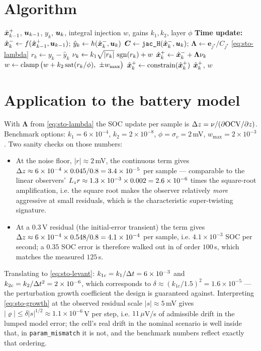 \section{Algorithm}
\begin{algorithm}[H]
\caption{SuperTwisting-SMO --- one sampling period}
\begin{algorithmic}[1]
\Require $\hat{\bm{x}}^{+}_{k-1}$, $\bm{u}_{k-1}$, $y_k$, $\bm{u}_k$, integral injection $w$, gains $k_1,k_2$, layer $\phi$
\State \textbf{Time update:} $\hat{\bm{x}}^{-}_k \gets f(\hat{\bm{x}}^{+}_{k-1},\bm{u}_{k-1})$; \quad $\hat{y}_k \gets h(\hat{\bm{x}}^{-}_k,\bm{u}_k)$
\State $\bm{C} \gets \texttt{jac\_H}(\hat{\bm{x}}^{-}_k,\bm{u}_k)$; \quad $\bm{\Lambda}\gets \bm{e}_{j^\star}/C_{j^\star}$ \eqref{eq:sto-lambda}
\State $r_k \gets y_k - \hat{y}_k$
\State $\nu_k \gets k_1\sqrt{|r_k|}\,\operatorname{sgn}(r_k) + w$ 
\State $\hat{\bm{x}}^{+}_k \gets \hat{\bm{x}}^{-}_k + \bm{\Lambda}\nu_k$
\State $w \gets \operatorname{clamp}\big(w + k_2\operatorname{sat}(r_k/\phi),\ \pm w_{\max}\big)$ 
\State $\hat{\bm{x}}^{+}_k \gets \operatorname{constrain}(\hat{\bm{x}}^{+}_k)$
\Ensure $\hat{\bm{x}}^{+}_k$, $w$
\end{algorithmic}
\end{algorithm}

\section{Application to the battery model}
With $\bm{\Lambda}$ from \eqref{eq:sto-lambda} the SOC update per sample is
$\Delta z = \nu/(\partial\mathrm{OCV}/\partial z)$.  Benchmark options: $k_1 = 6\times10^{-4}$,
$k_2 = 2\times10^{-8}$, $\phi = \sigma_v = 2$\,mV, $w_{\max}=2\times10^{-3}$.  Two sanity checks
on those numbers:
\begin{itemize}[nosep]
\item At the noise floor, $|r| \approx 2$\,mV, the continuous term gives
$\Delta z \approx 6\times10^{-4}\times0.045/0.8 = 3.4\times10^{-5}$ per sample --- comparable to
the linear observers' $L_{z}r \approx 1.3\times10^{-3}\times0.002 = 2.6\times10^{-6}$ times
the square-root amplification, i.e. the square root makes the observer relatively \emph{more}
aggressive at small residuals, which is the characteristic super-twisting signature.
\item At a $0.3$\,V residual (the initial-error transient) the term gives
$\Delta z \approx 6\times10^{-4}\times0.548/0.8 = 4.1\times10^{-4}$ per sample, i.e.
$4.1\times10^{-3}$ SOC per second; a $0.35$ SOC error is therefore walked out in of order
$100$\,s, which matches the measured $125$\,s.
\end{itemize}
Translating to \eqref{eq:sto-levant}: $k_{1c} = k_1/\Delta t = 6\times10^{-3}$ and
$k_{2c} = k_2/\Delta t^2 = 2\times10^{-6}$, which corresponds to
$\delta \approx (k_{1c}/1.5)^2 = 1.6\times10^{-5}$ --- the perturbation growth coefficient the
design is guaranteed against.  Interpreting \eqref{eq:sto-growth} at the observed residual scale
$|s|\approx 5$\,mV gives $|\varrho|\le \delta|s|^{1/2}\approx 1.1\times10^{-6}$\,V per step, i.e.
$11\,\mu$V/s of admissible drift in the lumped model error; the cell's real drift in the nominal
scenario is well inside that, in \texttt{param\_mismatch} it is not, and the benchmark numbers
reflect exactly that ordering.

